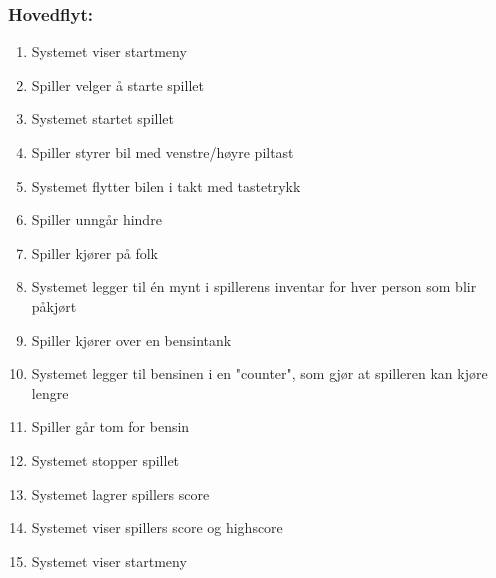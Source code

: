 \documentclass[12pt]{report}
\begin{document}
\subsubsection*{Hovedflyt:}
\begin{enumerate}
\item Systemet viser startmeny
\item Spiller velger å starte spillet
\item Systemet startet spillet
\item Spiller styrer bil med venstre/høyre piltast
\item Systemet flytter bilen i takt med tastetrykk
\item Spiller unngår hindre
\item Spiller kjører på folk
\item Systemet legger til én mynt i spillerens inventar for hver person som blir påkjørt
\item Spiller kjører over en bensintank
\item Systemet legger til bensinen i en "counter", som gjør at spilleren kan kjøre lengre
\item Spiller går tom for bensin
\item Systemet stopper spillet
\item Systemet lagrer spillers score
\item Systemet viser spillers score og highscore
\item Systemet viser startmeny
\end{enumerate}
\pagebreak
\end{document}
